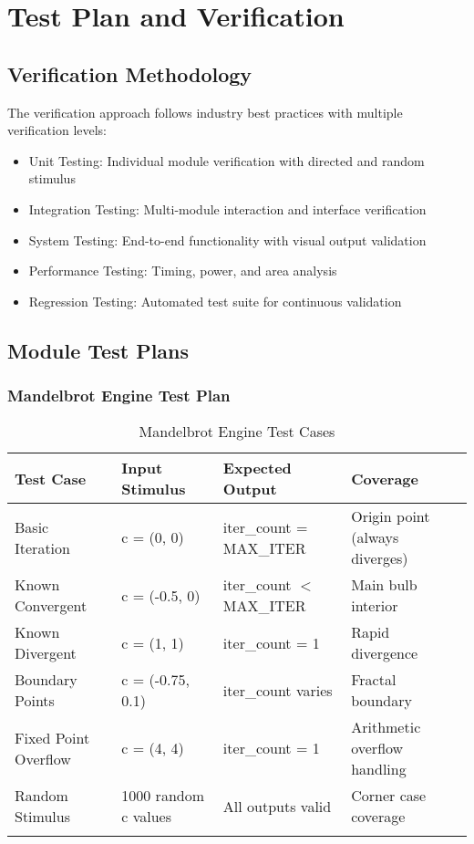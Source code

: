 \documentclass[11pt,a4paper]{article}
\begin{document}
\newpage
\section{Test Plan and Verification}

\subsection{Verification Methodology}
The verification approach follows industry best practices with multiple verification levels:
\begin{itemize}
\item Unit Testing: Individual module verification with directed and random stimulus
\item Integration Testing: Multi-module interaction and interface verification
\item System Testing: End-to-end functionality with visual output validation
\item Performance Testing: Timing, power, and area analysis
\item Regression Testing: Automated test suite for continuous validation
\end{itemize}

\subsection{Module Test Plans}

\subsubsection{Mandelbrot Engine Test Plan}
\begin{longtable}{|p{2cm}|p{2.5cm}|p{2.5cm}|p{4cm}|}
\hline
\rowcolor{darkred!20}
\textbf{Test Case} & \textbf{Input Stimulus} & \textbf{Expected Output} & \textbf{Coverage} \\
\hline
Basic Iteration & c = (0, 0) & iter\_count = MAX\_ITER & Origin point (always diverges) \\
\hline
Known Convergent & c = (-0.5, 0) & iter\_count $<$ MAX\_ITER & Main bulb interior \\
\hline
Known Divergent & c = (1, 1) & iter\_count = 1 & Rapid divergence \\
\hline
Boundary Points & c = (-0.75, 0.1) & iter\_count varies & Fractal boundary \\
\hline
Fixed Point Overflow & c = (4, 4) & iter\_count = 1 & Arithmetic overflow handling \\
\hline
Random Stimulus & 1000 random c values & All outputs valid & Corner case coverage \\
\hline
\caption{Mandelbrot Engine Test Cases}
\end{longtable}
\end{document}
